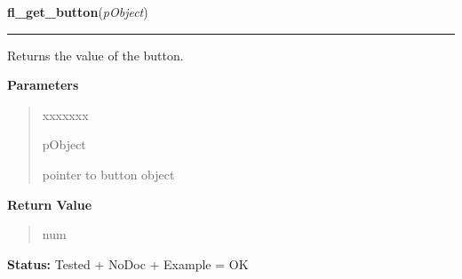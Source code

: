     \label{xformslib:library:fl_get_button}

    \vspace{0.5ex}

\hspace{.8\funcindent}\begin{boxedminipage}{\funcwidth}

    \raggedright \textbf{fl\_get\_button}(\textit{pObject})

    \vspace{-1.5ex}

    \rule{\textwidth}{0.5\fboxrule}
\setlength{\parskip}{2ex}
    Returns the value of the button.

\setlength{\parskip}{1ex}
      \textbf{Parameters}
      \vspace{-1ex}

      \begin{quote}
        \begin{Ventry}{xxxxxxx}

          \item[pObject]

          pointer to button object

        \end{Ventry}

      \end{quote}

      \textbf{Return Value}
    \vspace{-1ex}

      \begin{quote}
      num

      \end{quote}

\textbf{Status:} Tested + NoDoc + Example = OK



    \end{boxedminipage}

    \label{xformslib:library:fl_set_button}

    \vspace{0.5ex}

